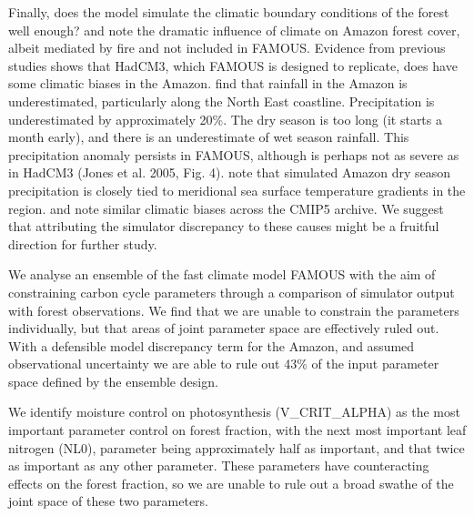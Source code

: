 \documentclass[esd, article]{copernicus} %
\begin{document}
Finally, does the model simulate the climatic boundary conditions of the forest well enough? \cite{malhi2009amazon} and \cite{staver2011determinants} note the dramatic influence of climate on Amazon forest cover, albeit mediated by fire and not included in FAMOUS. Evidence from previous studies shows that HadCM3, which FAMOUS is designed to replicate, does have some climatic biases in the Amazon. \cite{cox2004amazon} find that rainfall in the Amazon is underestimated, particularly along the North East coastline. Precipitation is underestimated by approximately 20\%. The dry season is too long (it starts a month early), and there is an underestimate of wet season rainfall. This precipitation anomaly persists in FAMOUS, although is perhaps not as severe as in HadCM3 (Jones et al. 2005, Fig.  4). \cite{good2008objective} note that simulated Amazon dry season precipitation is closely tied to meridional sea surface temperature gradients in the region. \cite{joetzjer2013amazon} and \cite{yin2012precipitation} note similar climatic biases across the CMIP5 archive. We suggest that attributing the simulator discrepancy to these causes might be a fruitful direction for further study.

\conclusions \label{sec:conclusions} %

We analyse an ensemble of the fast climate model FAMOUS with the aim of constraining carbon cycle parameters through a comparison of simulator output with forest observations. We find that we are unable to constrain the parameters individually, but that areas of joint parameter space are effectively ruled out. With a defensible model discrepancy term for the Amazon, and assumed observational uncertainty we are able to rule out 43\% of the input parameter space defined by the ensemble design.

We identify moisture control on photosynthesis (V\_CRIT\_ALPHA) as the most important parameter control on forest fraction, with the next most important leaf nitrogen (NL0), parameter being approximately half as important, and that twice as important as any other parameter. These parameters have counteracting effects on the forest fraction, so we are unable to rule out a broad swathe of the joint space of these two parameters.
\end{document}
